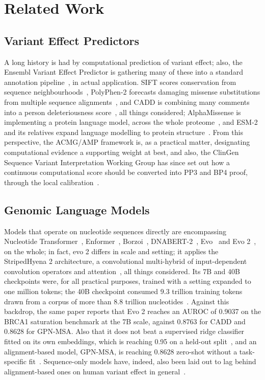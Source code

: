 \documentclass[10pt,journal]{IEEEtran}
\begin{document}
\section{Related Work}
\label{sec:related}

\subsection{Variant Effect Predictors}
A long history is had by computational prediction of variant effect; also, the Ensembl Variant Effect Predictor is gathering many of these into a standard annotation pipeline~\cite{mclaren2016vep,hunt2022vep}, in actual application. SIFT scores conservation from sequence neighbourhoods~\cite{ng2001sift}, PolyPhen-2 forecasts damaging missense substitutions from multiple sequence alignments~\cite{adzhubei2010polyphen2}, and CADD is combining many comments into a person deleteriousness score~\cite{rentzsch2019cadd,schubach2024cadd}, all things considered; AlphaMissense is implementing a protein language model, across the whole proteome~\cite{cheng2023alphamissense}, and ESM-2 and its relatives expand language modelling to protein structure~\cite{lin2023esm2}. From this perspective, the ACMG/AMP framework is, as a practical matter, designating computational evidence a supporting weight at best, and also, the ClinGen Sequence Variant Interpretation Working Group has since set out how a continuous computational score should be converted into PP3 and BP4 proof, through the local calibration~\cite{pejaver2022svi,tavtigian2018acmg,tavtigian2020points}.

\subsection{Genomic Language Models}
Models that operate on nucleotide sequences directly are encompassing Nucleotide Transformer~\cite{dallatorre2024nt}, Enformer~\cite{avsec2021enformer}, Borzoi~\cite{linder2025borzoi}, DNABERT-2~\cite{zhou2024dnabert2}, Evo~\cite{nguyen2024evo} and Evo 2~\cite{brixi2026evo2}, on the whole; in fact, evo 2 differs in scale and setting; it applies the StripedHyena 2 architecture, a convolutional multi-hybrid of input-dependent convolution operators and attention~\cite{brixi2025stripedhyena2}, all things considered. Its 7B and 40B checkpoints were, for all practical purposes, trained with a setting expanded to one million tokens; the 40B checkpoint consumed 9.3 trillion training tokens drawn from a corpus of more than 8.8 trillion nucleotides~\cite{brixi2026evo2}. Against this backdrop, the same paper reports that Evo 2 reaches an AUROC of 0.9037 on the BRCA1 saturation benchmark at the 7B scale, against 0.8763 for CADD and 0.8628 for GPN-MSA. Also that it does not beat a supervised ridge classifier fitted on its own embeddings, which is reaching 0.95 on a held-out split~\cite{brixi2026evo2}, and an alignment-based model, GPN-MSA, is reaching 0.8628 zero-shot without a task-specific fit~\cite{benegas2025gpnmsa}. Sequence-only models have, indeed, also been laid out to lag behind alignment-based ones on human variant effect in general~\cite{brixi2026evo2}.
\end{document}

